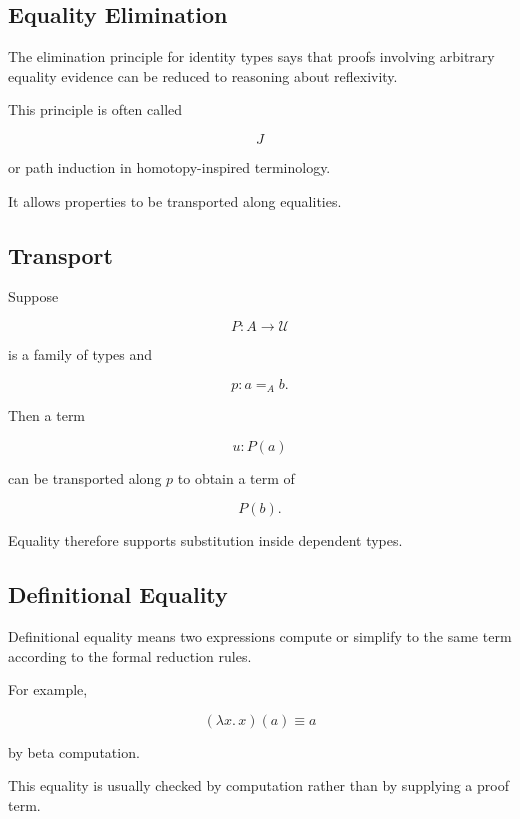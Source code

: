 \subsection{Equality Elimination}
\label{subsec:identity-elimination}

The elimination principle for identity types says that proofs involving
arbitrary equality evidence can be reduced to reasoning about reflexivity.

This principle is often called

\[
\boxed{
J
}
\]

or path induction in homotopy-inspired terminology.

It allows properties to be transported along equalities.

\subsection{Transport}
\label{subsec:type-theory-transport}

Suppose

\[
P:A\to\mathcal{U}
\]

is a family of types and

\[
p:a=_A b.
\]

Then a term

\[
u:P(a)
\]

can be transported along \(p\) to obtain a term of

\[
\boxed{
P(b).
}
\]

Equality therefore supports substitution inside dependent types.

\subsection{Definitional Equality}
\label{subsec:definitional-equality}

Definitional equality means two expressions compute or simplify to the same
term according to the formal reduction rules.

For example,

\[
\boxed{
(\lambda x.\,x)(a)
\equiv
a
}
\]

by beta computation.

This equality is usually checked by computation rather than by supplying a
proof term.

